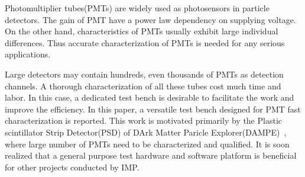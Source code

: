 \documentclass[5p, times]{elsarticle}
\begin{document}
Photomultiplier tubes(PMTs) are widely used as photosensors in particle detectors.
The gain of PMT have a power law dependency on supplying voltage.
On the other hand, characteristics of PMTs usually exhibit large individual differences.
Thus accurate characterization of PMTs is needed for any serious applications.

Large detectors may contain hundreds, even thousands of PMTs as detection channels.
A thorough characterization of all these tubes cost much time and labor.
In this case, a dedicated test bench is desirable to facilitate the work and improve the efficiency.
In this paper, a versatile test bench designed for PMT fast characterization is reported.
This work is motivated primarily by the Plastic scintillator Strip Detector(PSD) of DArk Matter Paricle Explorer(DAMPE)~\cite{Chang_Jin_dampe}, where large number of PMTs need to be characterized and qualified.
It is soon realized that a general purpose test hardware and software platform is beneficial for other projects conducted by IMP.
\end{document}
